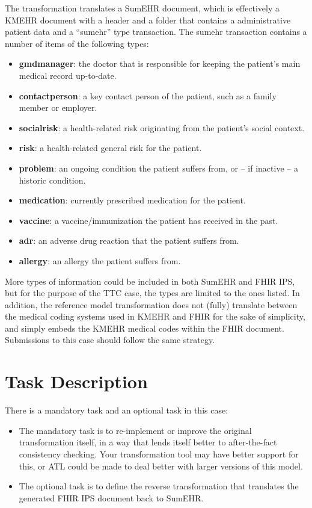 \documentclass[
twocolumn,
]{ceurart}
\begin{document}
The transformation translates a SumEHR document, which is effectively a KMEHR
document with a header and a folder that contains a administrative patient
data and a ``sumehr'' type transaction. The sumehr transaction contains a
number of items of the following types:

\begin{itemize}
\item \textbf{gmdmanager}: the doctor that is responsible for keeping the
  patient's main medical record up-to-date.
\item \textbf{contactperson}: a key contact person of the patient, such
  as a family member or employer.
\item \textbf{socialrisk}: a health-related risk originating from the
  patient's social context.
\item \textbf{risk}: a health-related general risk for the patient.
\item \textbf{problem}: an ongoing condition the patient suffers from,
  or -- if inactive -- a historic condition.
\item \textbf{medication}: currently prescribed medication for the patient.
\item \textbf{vaccine}: a vaccine/immunization the patient has received
  in the past.
\item \textbf{adr}: an adverse drug reaction that the patient suffers from.
\item \textbf{allergy}: an allergy the patient suffers from.
\end{itemize}

More types of information could be included in both SumEHR and FHIR IPS, but
for the purpose of the TTC case, the types are limited to the ones listed. In
addition, the reference model transformation does not (fully) translate between
the medical coding systems used in KMEHR and FHIR for the sake of simplicity,
and simply embeds the KMEHR medical codes within the FHIR document.
Submissions to this case should follow the same strategy.

\section{Task Description}
\label{sec:task-description}

There is a mandatory task and an optional task in this case:

\begin{itemize}
\item The mandatory task is to re-implement or improve the original
  transformation itself, in a way that lends itself better to after-the-fact
  consistency checking. Your transformation tool may have better support for
  this, or ATL could be made to deal better with larger versions of this model.

\item The optional task is to define the reverse transformation that translates
  the generated FHIR IPS document back to SumEHR.
\end{itemize}
\end{document}

